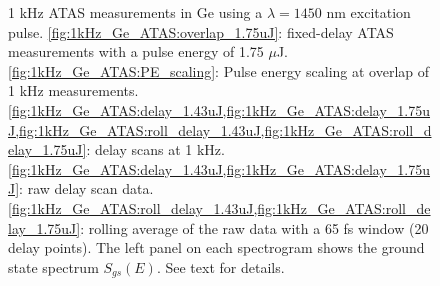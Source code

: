 \begin{figure}
	\qquad
	\caption{1 kHz ATAS measurements in Ge using a $\lambda = 1450 \text{ nm}$ excitation pulse. \cref{fig:1kHz_Ge_ATAS:overlap_1.75uJ}: fixed-delay ATAS measurements with a pulse energy of 1.75 $\mu$J. \cref{fig:1kHz_Ge_ATAS:PE_scaling}: Pulse energy scaling at overlap of 1 kHz measurements. \cref{fig:1kHz_Ge_ATAS:delay_1.43uJ,fig:1kHz_Ge_ATAS:delay_1.75uJ,fig:1kHz_Ge_ATAS:roll_delay_1.43uJ,fig:1kHz_Ge_ATAS:roll_delay_1.75uJ}: delay scans at 1 kHz.  \cref{fig:1kHz_Ge_ATAS:delay_1.43uJ,fig:1kHz_Ge_ATAS:delay_1.75uJ}: raw delay scan data. \cref{fig:1kHz_Ge_ATAS:roll_delay_1.43uJ,fig:1kHz_Ge_ATAS:roll_delay_1.75uJ}: rolling average of the raw data with a 65 fs window (20 delay points). The left panel on each spectrogram shows the ground state spectrum $S_{gs}(E)$. See text for details.}
	\label{fig:1kHz_Ge_ATAS:delay}
\end{figure}

